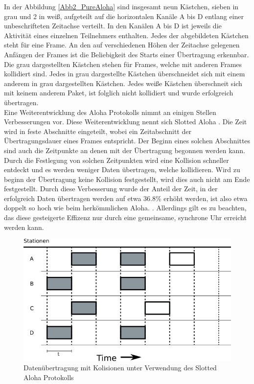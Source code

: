 In der Abbildung \ref{Abb2_PureAloha} sind insgesamt neun Kästchen, sieben in grau und 2 in weiß, aufgeteilt auf die horizontalen Kanäle A bis D entlang einer unbeschrifteten Zeitachse verteilt. In den Kanälen A bis D ist jeweils die Aktivität eines einzelnen Teilnehmers enthalten. Jedes der abgebildeten Kästchen steht für eine Frame. An den auf verschiedenen Höhen der Zeitachse gelegenen Anfängen der Frames ist die Beliebigkeit des Starts einer Übertragung erkennbar. Die grau dargestellten Kästchen stehen für Frames, welche mit anderen Frames kollidiert sind. Jedes in grau dargestellte Kästchen überschneidet sich mit einem anderem in grau dargestellten Kästchen. Jedes weiße Kästchen überschneit sich mit keinem anderem Paket, ist folglich nicht kollidiert und wurde erfolgreich übertragen.\\
Eine Weiterentwicklung des Aloha Protokolls nimmt an einigen Stellen Verbesserungen vor. Diese Weiterentwicklung nennt sich Slotted Aloha \cite{Back_AlohaPure}. Die Zeit wird in feste Abschnitte eingeteilt, wobei ein Zeitabschnitt der Übertragungsdauer eines Frames entspricht. Der Beginn eines solchen Abschnittes sind auch die Zeitpunkte an denen mit der Übertragung begonnen werden kann. Durch die Festlegung von solchen Zeitpunkten wird eine Kollision schneller entdeckt und es werden weniger Daten übertragen, welche kollidieren. Wird zu beginn der Übertragung keine Kollision festgestellt, wird dies auch nicht am Ende festgestellt. Durch diese Verbesserung wurde der Anteil der Zeit, in der erfolgreich Daten übertragen werden auf etwa 36.8\% erhöht werden, ist also etwa doppelt so hoch wie beim herkömmlichen Aloha. \cite{Back_AlohaPure}. Allerdings gilt es zu beachten, das diese gesteigerte Effizenz nur durch eine gemeinsame, synchrone Uhr erreicht werden kann.\\
\begin{figure}[h!]
	\begin{center}
	\includegraphics[scale=0.6]{img/ZeichnungExportSlotted3.png}
	\caption{Datenübertragung mit Kolisionen unter Verwendung des Slotted Aloha Protokolls}
	\end{center}
	\label{Abb_SlottedAloha}
\end{figure}
